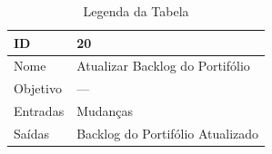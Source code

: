 \begin{table}[H]
  \centering
    \begin{tabular}{| m{5em} | m{10cm} |}
      \hline
      ID       & 20   \\ \hline
      Nome     & Atualizar Backlog do Portifólio  \\ \hline
      Objetivo & ---  \\ \hline
      Entradas & Mudanças \\ \hline
      Saídas   & Backlog do Portifólio Atualizado \\ \hline
    \end{tabular}
    \caption{Legenda da Tabela}
    \label{tabela:atividade20}
\end{table}
